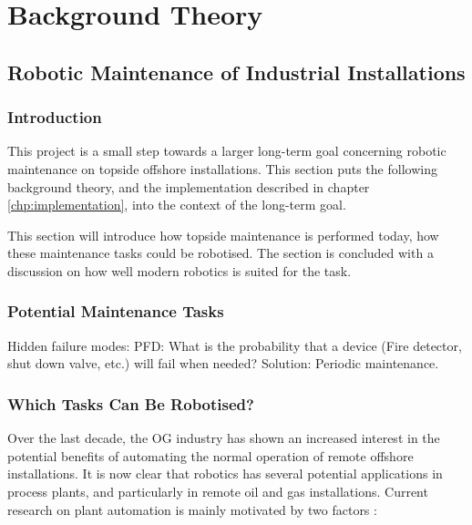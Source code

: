 \chapter{Background Theory}
\label{chp:theory} 


\section{Robotic Maintenance of Industrial Installations}

\subsection{Introduction}

This project is a small step towards a larger long-term goal concerning robotic maintenance on topside offshore installations. This section puts the following background theory, and the implementation described in chapter \ref{chp:implementation}, into the context of the long-term goal. 

This section will introduce how topside maintenance is performed today, how these maintenance tasks could be robotised. The section is concluded with a discussion on how well modern robotics is suited for the task. 

\subsection{Potential Maintenance Tasks}

Hidden failure modes: PFD: What is the probability that a device (Fire detector, shut down valve, etc.) will fail when needed? 
Solution: Periodic maintenance.

\subsection{Which Tasks Can Be Robotised?}


Over the last decade, the \ac{OG} industry has shown an increased interest in the potential benefits of automating the normal operation of remote offshore installations. It is now clear that robotics has several potential applications in process plants, and particularly in remote oil and gas installations. Current research on plant automation is mainly motivated by two factors\cite{AutonomousOG} \cite{StepwiseApproachToRobotics}:

